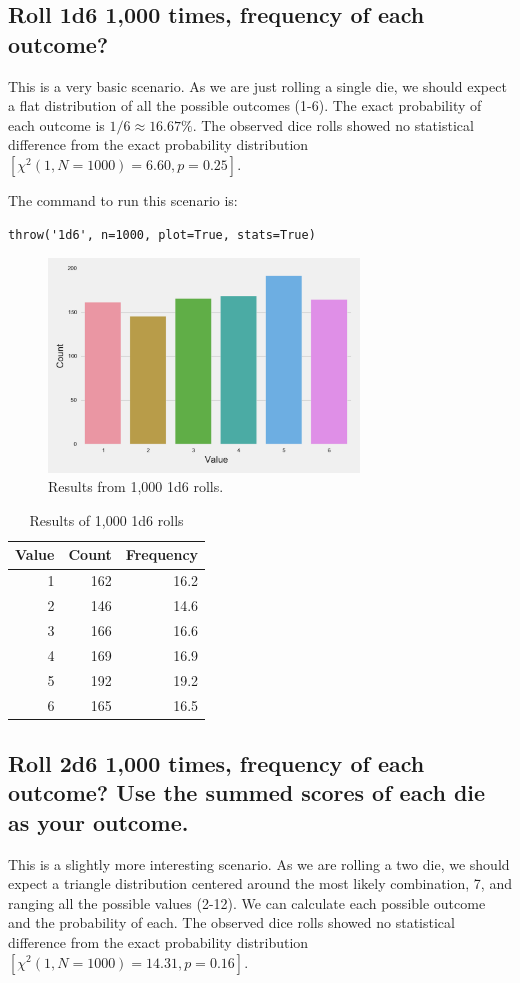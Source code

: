 \documentclass[twocolumn,letterpaper]{article}  %
\begin{document}
\subsection{Roll 1d6 1,000 times, frequency of each outcome?}
This is a very basic scenario. As we are just rolling a single die, we should expect a flat distribution of all the possible outcomes (1-6). The exact probability of each outcome is $1/6 \approx 16.67\%$. The observed dice rolls showed no statistical difference from the exact probability distribution $[\chi^2 (1,N=1000)=6.60, p=0.25]$.

The command to run this scenario is:
\begin{lstlisting}
throw('1d6', n=1000, plot=True, stats=True)
\end{lstlisting}
\begin{figure}[H]
\centering
\includegraphics[width=3.25in]{1d6.pdf}
\caption{Results from 1,000 1d6 rolls.}
\end{figure}

\begin{table}[H]
\begin{center}
\begin{tabular}{*{3}{r}}
\toprule
Value & Count & Frequency \\
\midrule
     1 &   162 &      16.2 \\
     2 &   146 &      14.6 \\
     3 &   166 &      16.6 \\
     4 &   169 &      16.9 \\
     5 &   192 &      19.2 \\
     6 &   165 &      16.5 \\
\bottomrule
\end{tabular}
\end{center}
\caption{Results of 1,000 1d6 rolls}
\end{table}

\subsection{Roll 2d6 1,000 times, frequency of each outcome? Use the summed scores of each die as your outcome.}
This is a slightly more interesting scenario. As we are rolling a two die, we should expect a triangle distribution centered around the most likely combination, 7, and ranging all the possible values (2-12). We can calculate each possible outcome and the probability of each. The observed dice rolls showed no statistical difference from the exact probability distribution $[\chi^2 (1,N=1000)=14.31, p=0.16]$.
\end{document}
